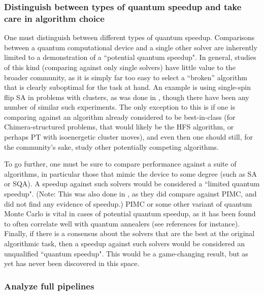 \subsubsection{Distinguish between types of quantum speedup and take care in algorithm choice}

	 One must distinguish between different types of quantum speedup. Comparisons between a quantum computational device and a single other solver are inherently limited to a demonstration of a ``potential quantum speedup". In general, studies of this kind (comparing against only single solvers) have little value to the broader community, as it is simply far too easy to select a ``broken'' algorithm that is clearly suboptimal for the task at hand. An example is using single-spin flip SA in problems with clusters, as was done in \cite{PhysRevX.6.031015}, though there have been any number of similar such experiments. The only exception to this is if one is comparing against an algorithm already considered to be best-in-class (for Chimera-structured problems, that would likely be the HFS algorithm, or perhaps PT with isoenergetic cluster moves), and even then one should still, for the community's sake, study other potentially competing algorithms.

	 To go further, one must be sure to compare performance against a suite of algorithms, in particular those that mimic the device to some degree (such as SA or SQA). A speedup against such solvers would be considered a ``limited quantum speedup". (Note: This was also done in \cite{PhysRevX.6.031015}, as they did compare against PIMC, and did not find any evidence of speedup.) PIMC or some other variant of quantum Monte Carlo is vital in cases of potential quantum speedup, as it has been found to often correlate well with quantum annealers (see references \cite{q108,speedup} for instance). Finally, if there is a consensus about the solvers that are the best at the original algorithmic task, then a speedup against such solvers would be considered an unqualified ``quantum speedup". This would be a game-changing result, but as yet has never been discovered in this space.

\subsubsection{Analyze full pipelines}

